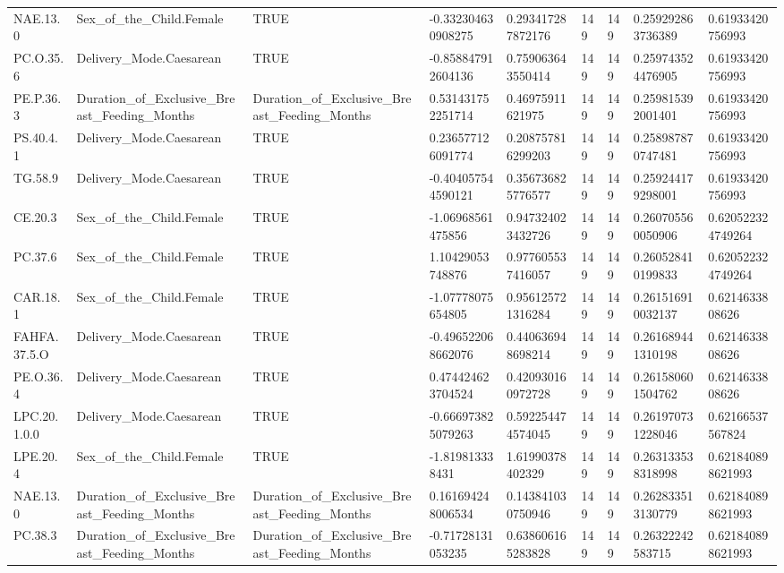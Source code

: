 \begin{longtable}{lllllllll}
NAE.13.0 & Sex\_of\_the\_Child.Female & TRUE & -0.332304630908275 & 0.293417287872176 & 149 & 149 & 0.259292863736389 & 0.61933420756993 \\
PC.O.35.6 & Delivery\_Mode.Caesarean & TRUE & -0.858847912604136 & 0.759063643550414 & 149 & 149 & 0.259743524476905 & 0.61933420756993 \\
PE.P.36.3 & Duration\_of\_Exclusive\_Breast\_Feeding\_Months & Duration\_of\_Exclusive\_Breast\_Feeding\_Months & 0.531431752251714 & 0.46975911621975 & 149 & 149 & 0.259815392001401 & 0.61933420756993 \\
PS.40.4.1 & Delivery\_Mode.Caesarean & TRUE & 0.236577126091774 & 0.208757816299203 & 149 & 149 & 0.258987870747481 & 0.61933420756993 \\
TG.58.9 & Delivery\_Mode.Caesarean & TRUE & -0.404057544590121 & 0.356736825776577 & 149 & 149 & 0.259244179298001 & 0.61933420756993 \\
CE.20.3 & Sex\_of\_the\_Child.Female & TRUE & -1.06968561475856 & 0.947324023432726 & 149 & 149 & 0.260705560050906 & 0.620522324749264 \\
PC.37.6 & Sex\_of\_the\_Child.Female & TRUE & 1.10429053748876 & 0.977605537416057 & 149 & 149 & 0.260528410199833 & 0.620522324749264 \\
CAR.18.1 & Sex\_of\_the\_Child.Female & TRUE & -1.07778075654805 & 0.956125721316284 & 149 & 149 & 0.261516910032137 & 0.6214633808626 \\
FAHFA.37.5.O & Delivery\_Mode.Caesarean & TRUE & -0.496522068662076 & 0.440636948698214 & 149 & 149 & 0.261689441310198 & 0.6214633808626 \\
PE.O.36.4 & Delivery\_Mode.Caesarean & TRUE & 0.474424623704524 & 0.420930160972728 & 149 & 149 & 0.261580601504762 & 0.6214633808626 \\
LPC.20.1.0.0 & Delivery\_Mode.Caesarean & TRUE & -0.666973825079263 & 0.592254474574045 & 149 & 149 & 0.261970731228046 & 0.62166537567824 \\
LPE.20.4 & Sex\_of\_the\_Child.Female & TRUE & -1.819813338431 & 1.61990378402329 & 149 & 149 & 0.263133538318998 & 0.621840898621993 \\
NAE.13.0 & Duration\_of\_Exclusive\_Breast\_Feeding\_Months & Duration\_of\_Exclusive\_Breast\_Feeding\_Months & 0.161694248006534 & 0.143841030750946 & 149 & 149 & 0.262833513130779 & 0.621840898621993 \\
PC.38.3 & Duration\_of\_Exclusive\_Breast\_Feeding\_Months & Duration\_of\_Exclusive\_Breast\_Feeding\_Months & -0.71728131053235 & 0.638606165283828 & 149 & 149 & 0.26322242583715 & 0.621840898621993 \\

\end{longtable}
